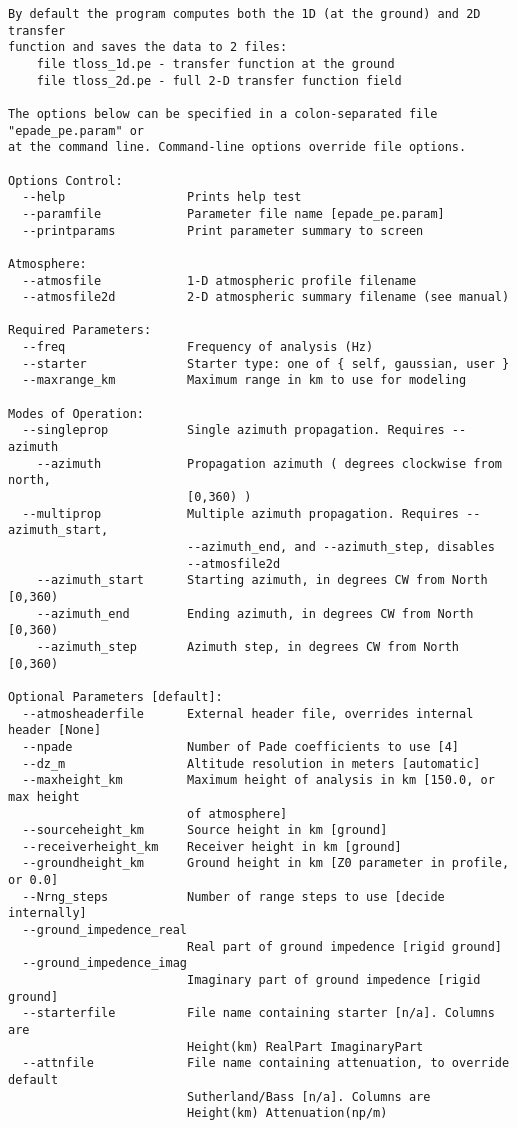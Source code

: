 \begin{verbatim}
By default the program computes both the 1D (at the ground) and 2D transfer
function and saves the data to 2 files:
    file tloss_1d.pe - transfer function at the ground
    file tloss_2d.pe - full 2-D transfer function field

The options below can be specified in a colon-separated file "epade_pe.param" or
at the command line. Command-line options override file options.

Options Control:
  --help                 Prints help test
  --paramfile            Parameter file name [epade_pe.param]
  --printparams          Print parameter summary to screen

Atmosphere:
  --atmosfile            1-D atmospheric profile filename
  --atmosfile2d          2-D atmospheric summary filename (see manual)

Required Parameters:
  --freq                 Frequency of analysis (Hz)
  --starter              Starter type: one of { self, gaussian, user }
  --maxrange_km          Maximum range in km to use for modeling

Modes of Operation:
  --singleprop           Single azimuth propagation. Requires --azimuth
    --azimuth            Propagation azimuth ( degrees clockwise from north,
                         [0,360) )
  --multiprop            Multiple azimuth propagation. Requires --azimuth_start,
                         --azimuth_end, and --azimuth_step, disables
                         --atmosfile2d
    --azimuth_start      Starting azimuth, in degrees CW from North [0,360)
    --azimuth_end        Ending azimuth, in degrees CW from North [0,360)
    --azimuth_step       Azimuth step, in degrees CW from North [0,360)

Optional Parameters [default]:
  --atmosheaderfile      External header file, overrides internal header [None]
  --npade                Number of Pade coefficients to use [4]
  --dz_m                 Altitude resolution in meters [automatic]
  --maxheight_km         Maximum height of analysis in km [150.0, or max height
                         of atmosphere]
  --sourceheight_km      Source height in km [ground]
  --receiverheight_km    Receiver height in km [ground]
  --groundheight_km      Ground height in km [Z0 parameter in profile, or 0.0]
  --Nrng_steps           Number of range steps to use [decide internally]
  --ground_impedence_real
                         Real part of ground impedence [rigid ground]
  --ground_impedence_imag
                         Imaginary part of ground impedence [rigid ground]
  --starterfile          File name containing starter [n/a]. Columns are
                         Height(km) RealPart ImaginaryPart
  --attnfile             File name containing attenuation, to override default
                         Sutherland/Bass [n/a]. Columns are
                         Height(km) Attenuation(np/m)


\end{verbatim}
